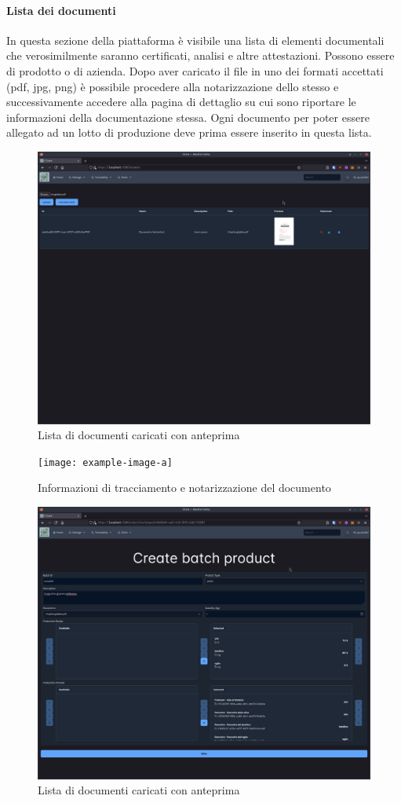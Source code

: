 \documentclass[a4paper,11pt]{article}
\begin{document}
\paragraph{Lista dei documenti}
In questa sezione della piattaforma è visibile una lista di elementi documentali che verosimilmente saranno certificati, analisi e altre attestazioni. Possono essere di prodotto o di azienda. Dopo aver caricato il file in uno dei formati accettati (pdf, jpg, png) è possibile procedere alla notarizzazione dello stesso e successivamente accedere alla pagina di dettaglio su cui sono riportare le informazioni della documentazione stessa. Ogni documento per poter essere allegato ad un lotto di produzione deve prima essere inserito in questa lista.
\begin{figure}[H]
  \centering
  \includegraphics[width=0.5\linewidth]{screenIotChain/0011.png}
  \caption{Lista di documenti caricati con anteprima}
  \label{fig:screen11}
\end{figure}


\begin{figure}[H]
  \centering
  \texttt{[image: example-image-a]}
  \caption{Informazioni di tracciamento e notarizzazione del documento}
  \label{fig:screen11a}
\end{figure}

\begin{figure}[H]
  \centering
  \includegraphics[width=0.5\linewidth]{screenIotChain/0012.png}
  \caption{Lista di documenti caricati con anteprima}
  \label{fig:screen12}
\end{figure}
\end{document}
